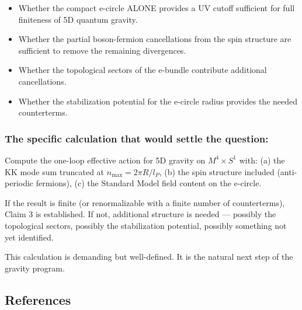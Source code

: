 \documentclass[aps,prd,preprint,superscriptaddress,longbibliography,floatfix]{revtex4-2}
\theoremstyle{remark}
\begin{document}
\begin{itemize}
  \item Whether the compact e-circle ALONE provides a UV cutoff sufficient for full finiteness of 5D quantum gravity.
  \item Whether the partial boson-fermion cancellations from the spin structure are sufficient to remove the remaining divergences.
  \item Whether the topological sectors of the e-bundle contribute additional cancellations.
  \item Whether the stabilization potential for the e-circle radius provides the needed counterterms.
\end{itemize}


\subsubsection{The specific calculation that would settle the question:}

Compute the one-loop effective action for 5D gravity on $M^{4} \times S^{1}$ with: (a) the KK mode sum truncated at $n_{\max} = 2\pi R/l_P$, (b) the spin structure included (anti-periodic fermions), (c) the Standard Model field content on the e-circle.

If the result is finite (or renormalizable with a finite number of counterterms), Claim 3 is established. If not, additional structure is needed --- possibly the topological sectors, possibly the stabilization potential, possibly something not yet identified.

This calculation is demanding but well-defined. It is the natural next step of the gravity program.



\subsection{References}
\end{document}
